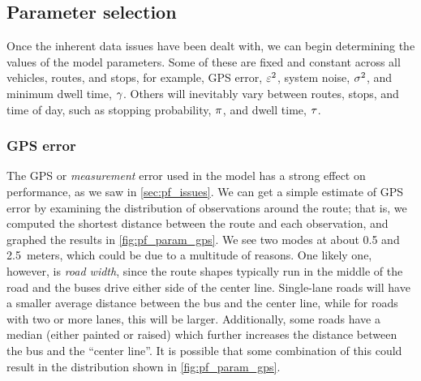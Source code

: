 \subsection{Parameter selection}
\label{sec:pf_params}

Once the inherent data issues have been dealt with,
we can begin determining the values of the model parameters.
Some of these are fixed and constant across all vehicles, routes, and stops,
for example,
GPS error, $\varepsilon^2$,
system noise, $\sigma^2$,
and minimum dwell time, $\gamma$.
Others will inevitably vary between routes, stops, and time of day,
such as stopping probability, $\pi$,
and dwell time, $\tau$.




\subsubsection{GPS error}
\label{sec:pf_params_gps}

The GPS or \emph{measurement} error used in the model has a strong effect on performance, as we saw in \cref{sec:pf_issues}. We can get a simple estimate of GPS error by examining the distribution of observations around the route; that is, we computed the shortest distance between the route and each observation, and graphed the results in \cref{fig:pf_param_gps}. We see two modes at about 0.5 and 2.5~meters, which could be due to a multitude of reasons. One likely one, however, is \emph{road width}, since the route shapes typically run in the middle of the road and the buses drive either side of the center line. Single-lane roads will have a smaller average distance between the bus and the center line, while for roads with two or more lanes, this will be larger. Additionally, some roads have a median (either painted or raised) which further increases the distance between the bus and the ``center line''. It is possible that some combination of this could result in the distribution shown in \cref{fig:pf_param_gps}.



